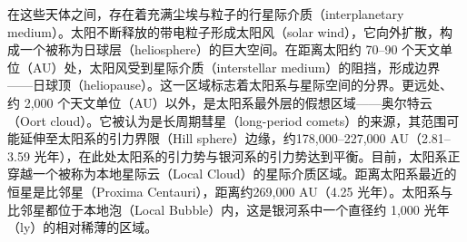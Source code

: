 在这些天体之间，存在着充满尘埃与粒子的行星际介质（interplanetary medium）。太阳不断释放的带电粒子形成太阳风（solar wind），它向外扩散，构成一个被称为日球层（heliosphere）的巨大空间。在距离太阳约 70–90 个天文单位（AU）处，太阳风受到星际介质（interstellar medium）的阻挡，形成边界——日球顶（heliopause）。这一区域标志着太阳系与星际空间的分界。更远处、约 2,000 个天文单位（AU）以外，是太阳系最外层的假想区域——奥尔特云（Oort cloud）。它被认为是长周期彗星（long-period comets）的来源，其范围可能延伸至太阳系的引力界限（Hill sphere）边缘，约178,000–227,000 AU（2.81–3.59 光年），在此处太阳系的引力势与银河系的引力势达到平衡。目前，太阳系正穿越一个被称为本地星际云（Local Cloud）的星际介质区域。距离太阳系最近的恒星是比邻星（Proxima Centauri），距离约269,000 AU（4.25 光年）。太阳系与比邻星都位于本地泡（Local Bubble）内，这是银河系中一个直径约 1,000 光年（ly）的相对稀薄的区域。

